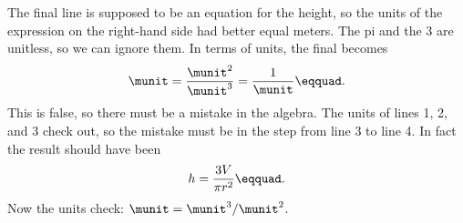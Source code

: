 The final line is supposed to be an equation for the height, so the units of the
expression on the right-hand side had better equal meters. 
The pi and the 3 are unitless, so we can ignore them.   
In terms of units, the final becomes
\begin{equation*}
  \munit = \frac{\munit^2}{\munit^3} = \frac{1}{\munit}\eqquad.
\end{equation*}
This is false, so there must be a mistake in the algebra. The units
of lines 1, 2, and 3 check out, so the mistake must be in the step
from line 3 to line 4. In fact the result should have been 
\begin{equation*}
  h = \frac{3V}{\pi r^2}\eqquad.
\end{equation*}
Now the units check: $\munit = \munit^3/\munit^2$.
